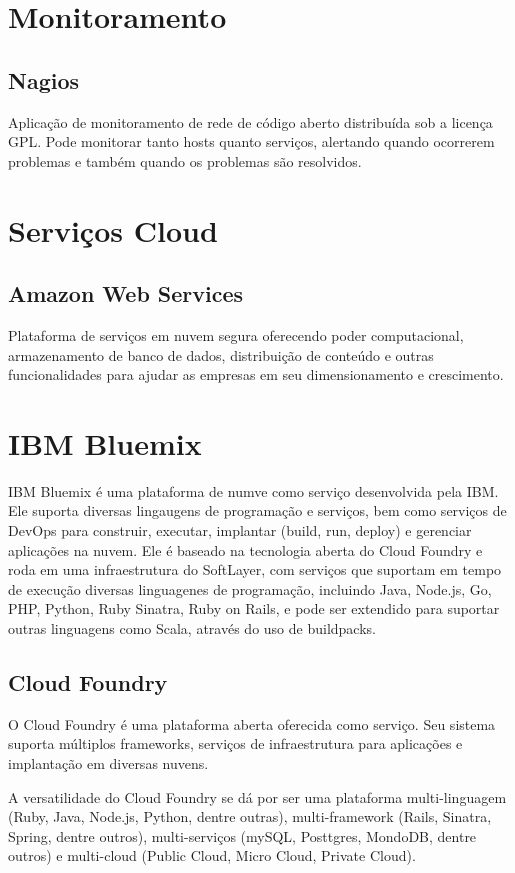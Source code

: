     \section{Monitoramento}

	\subsection{Nagios} Aplicação de monitoramento de rede de código
	aberto distribuída sob a licença GPL. Pode monitorar tanto hosts
	quanto serviços, alertando quando ocorrerem problemas e também
	quando os problemas são resolvidos.

    \section{Serviços Cloud}

	\subsection{Amazon Web Services} Plataforma de serviços em nuvem
	segura oferecendo poder computacional, armazenamento de banco de
	dados, distribuição de conteúdo e outras funcionalidades para
	ajudar as empresas em seu dimensionamento e crescimento.

\section{IBM Bluemix}
IBM Bluemix é uma plataforma de numve como serviço desenvolvida pela IBM. Ele suporta diversas lingaugens de programação e serviços, bem como serviços de DevOps para construir, executar, implantar (build, run, deploy) e gerenciar aplicações na nuvem. Ele é baseado na tecnologia aberta do Cloud Foundry e roda em uma infraestrutura do SoftLayer, com serviços que suportam em tempo de execução diversas linguagenes de programação, incluindo Java, Node.js, Go, PHP, Python, Ruby Sinatra, Ruby on Rails, e pode ser extendido para suportar outras linguagens como Scala, através do uso de buildpacks.

\subsection{Cloud Foundry}
O Cloud Foundry é uma plataforma aberta oferecida como serviço. Seu sistema suporta múltiplos frameworks, serviços de infraestrutura para aplicações e implantação em diversas nuvens.

A versatilidade do Cloud Foundry se dá por ser uma plataforma multi-linguagem (Ruby, Java, Node.js, Python, dentre outras), multi-framework (Rails, Sinatra, Spring, dentre outros), multi-serviços (mySQL, Posttgres, MondoDB, dentre outros) e multi-cloud (Public Cloud, Micro Cloud, Private Cloud).

